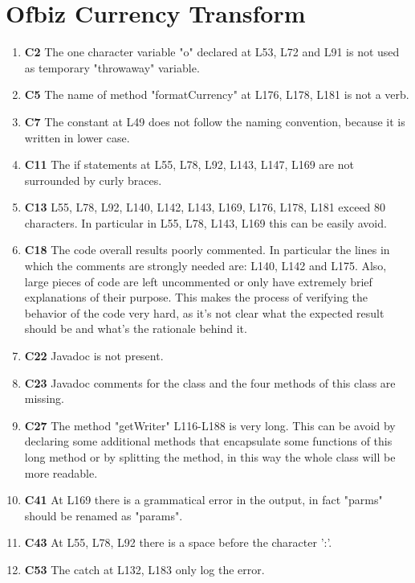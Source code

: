 \section{Ofbiz Currency Transform}

\begin{enumerate}
\item \textbf{C2} The one character variable "o" declared at L53, L72 and L91 is not used as temporary "throwaway" variable.
\item \textbf{C5} The name of method "formatCurrency" at L176, L178, L181 is not a verb.
\item \textbf{C7} The constant at L49 does not follow the naming convention, because it is written in lower case.
\item \textbf{C11} The if statements at L55, L78, L92, L143, L147, L169 are not surrounded by curly braces.
\item \textbf{C13} L55, L78, L92, L140, L142, L143, L169, L176, L178, L181 exceed 80 characters. In particular in L55, L78, L143, L169 this can be easily avoid.
\item \textbf{C18} The code overall results poorly commented. In particular the lines in which the comments are strongly needed are: L140, L142 and L175. Also, large pieces of code are left uncommented or only have extremely brief explanations of their purpose. This makes the process of verifying the behavior of the code very hard, as it's not clear what the expected result should be and what’s the rationale behind it.
\item \textbf{C22} Javadoc is not present.
\item \textbf{C23} Javadoc comments for the class and the four methods of this class are missing.
\item \textbf{C27} The method "getWriter" L116-L188 is very long. This can be avoid by declaring some additional methods that encapsulate some functions of this long method or by splitting the method, in this way the whole class will be more readable.
\item \textbf{C41} At L169 there is a grammatical error in the output, in fact "parms" should be renamed as "params".
\item \textbf{C43} At L55, L78, L92 there is a space before the character ':'.
\item \textbf{C53} The catch at L132, L183 only log  the error.
\end{enumerate}